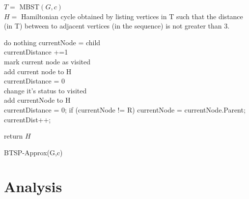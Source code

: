 \documentclass[runningheads, a4paper]{llncs}
\begin{document}
\begin{algorithm}[H]
    $T = $ MBST$(G,c)$ \\
    
    $H = $ Hamiltonian cycle obtained by listing vertices in T such that the distance (in T) between to adjacent vertices (in the sequence) is not greater than 3. \\
    
    {
		{
			{
				do nothing
			}
			\Else
			{
				currentNode = child\\
				currentDistance +=1\\
				{
					mark current node as visited \\
					add current node to H\\
					currentDistance = 0 \\
				}
			}
		}
		{
			{
				change it's status to visited\\
				add currentNode to H\\
				currentDistance = 0;
			}
			if (currentNode != R)		
			{
				currentNode = currentNode.Parent;
				currentDist++;
			}
		}		
		
    }
    
    return $H$
    \caption{BTSP-Approx(G,c)}
    \label{alg:btsp}
\end{algorithm}

\section{Analysis}

\end{document}
